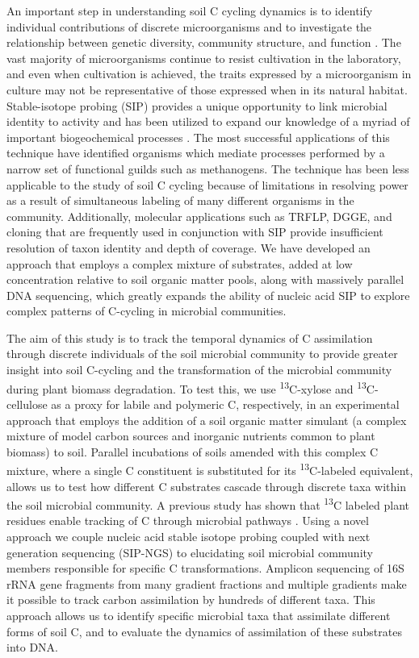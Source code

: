 An important step in understanding soil C cycling dynamics is to identify individual contributions of discrete microorganisms and to investigate the relationship between genetic diversity, community structure, and function \cite{O_Donnell_2002}. The vast majority of microorganisms continue to resist cultivation in the laboratory, and even when cultivation is achieved, the traits expressed by a microorganism in culture may not be representative of those expressed when in its natural habitat. Stable-isotope probing (SIP) provides a unique opportunity to link microbial identity to activity and has been utilized to expand our knowledge of a myriad of important biogeochemical processes \cite{Chen_Murrell_2010}. The most successful applications of this technique have identified organisms which mediate processes performed by a narrow set of functional guilds such as methanogens\cite{Lu_2005}. The technique has been less applicable to the study of soil C cycling because of limitations in resolving power as a result of simultaneous labeling of many different organisms in the community. Additionally, molecular applications such as TRFLP, DGGE, and cloning that are frequently used in conjunction with SIP provide insufficient resolution of taxon identity and depth of coverage. We have developed an approach that employs a complex mixture of substrates, added at low concentration relative to soil organic matter pools, along with massively parallel DNA sequencing, which greatly expands the ability of nucleic acid SIP to explore complex patterns of C-cycling in microbial communities. 

The aim of this study is to track the temporal dynamics of C assimilation through discrete individuals of the soil microbial community to provide greater insight into soil C-cycling and the transformation of the microbial community during plant biomass degradation. To test this, we use \textsuperscript{13}C-xylose and \textsuperscript{13}C-cellulose as a proxy for labile and polymeric C, respectively, in an experimental approach that employs the addition of a soil organic matter simulant (a complex mixture of model carbon sources and inorganic nutrients common to plant biomass) to soil. Parallel incubations of soils amended with this complex C mixture, where a single C constituent is substituted for its \textsuperscript{13}C-labeled equivalent, allows us to test how different C substrates cascade through discrete taxa within the soil microbial community. A previous study has shown that \textsuperscript{13}C labeled plant residues enable tracking of C through microbial pathways \cite{Evershed_2006}. Using a novel approach we couple nucleic acid stable isotope probing coupled with next generation sequencing (SIP-NGS) to elucidating soil microbial community members responsible for specific C transformations. Amplicon sequencing of 16S rRNA gene fragments from many gradient fractions and multiple gradients make it possible to track carbon assimilation by hundreds of different taxa. This approach allows us to identify specific microbial taxa that assimilate different forms of soil C, and to evaluate the dynamics of assimilation of these substrates into DNA. 

 


